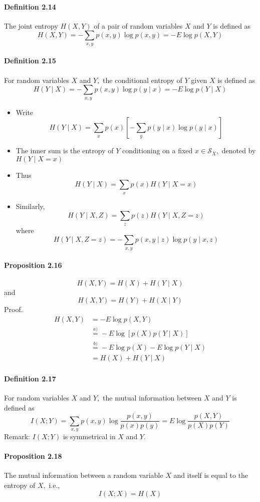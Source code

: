 \documentclass[8pt]{article}
\begin{document}
\paragraph{Definition 2.14} The joint entropy $H(X, Y)$ of a pair of random variables $X$ and $Y$ is defined as
$$
H(X, Y)=-\sum_{x, y} p(x, y) \log p(x, y)=-E \log p(X, Y)
$$

\paragraph{Definition 2.15} For random variables $X$ and $Y,$ the conditional entropy of $Y$ given $X$ is defined as
$$
H(Y \mid X)=-\sum_{x, y} p(x, y) \log p(y \mid x)=-E \log p(Y \mid X)
$$
\begin{itemize}
	\item Write
	$$
	H(Y \mid X)=\sum_{x} p(x)\left[-\sum_{y} p(y \mid x) \log p(y \mid x)\right]
	$$
	\item The inner sum is the entropy of $Y$ conditioning on a fixed $x \in \mathcal{S}_{X},$ denoted by $H(Y \mid X=x)$
	\item Thus
	$$
	H(Y \mid X)=\sum_{x} p(x) H(Y \mid X=x)
	$$
	\item Similarly,
	$$
	H(Y \mid X, Z)=\sum_{z} p(z) H(Y \mid X, Z=z)
	$$
	where
	$$
	H(Y \mid X, Z=z)=-\sum_{x, y} p(x, y \mid z) \log p(y \mid x, z)
	$$
\end{itemize}

\paragraph{Proposition 2.16}
$$
H(X, Y)=H(X)+H(Y \mid X)
$$
and
$$
H(X, Y)=H(Y)+H(X \mid Y)
$$
Proof.
$$
\begin{aligned}
H(X, Y) &=-E \log p(X, Y) \\
& \stackrel{a)}{=}-E \log [p(X) p(Y \mid X)] \\
& \stackrel{b)}{=}-E \log p(X)-E \log p(Y \mid X) \\
&=H(X)+H(Y \mid X)
\end{aligned}
$$

\paragraph{Definition 2.17} For random variables $X$ and $Y,$ the mutual information between $X$ and $Y$ is defined as
$$
I(X ; Y)=\sum_{x, y} p(x, y) \log \frac{p(x, y)}{p(x) p(y)}=E \log \frac{p(X, Y)}{p(X) p(Y)}
$$
Remark: $I(X ; Y)$ is symmetrical in $X$ and $Y$.
\paragraph{Proposition 2.18} The mutual information between a random variable $X$ and itself is equal to the entropy of $X,$ i.e., $$I(X ; X)=H(X)$$
\end{document}
